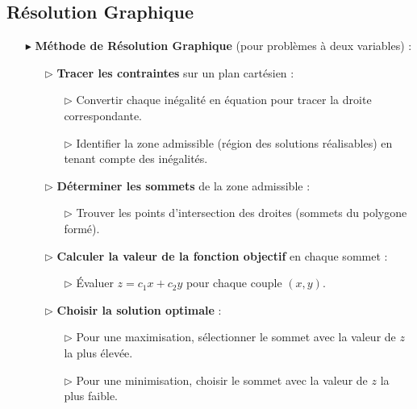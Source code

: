 \documentclass{report}
\begin{document}
\begin{multicols*}{2}
\section{Résolution Graphique}

\begin{itemize}
    \item[$\blacktriangleright$] \textbf{Méthode de Résolution Graphique} (pour problèmes à deux variables) :
    \begin{enumerate}
        \item[$\rhd$] \textbf{Tracer les contraintes} sur un plan cartésien :
        \begin{itemize}
            \item[$\rhd$] Convertir chaque inégalité en équation pour tracer la droite correspondante.
            \item[$\rhd$] Identifier la zone admissible (région des solutions réalisables) en tenant compte des inégalités.
        \end{itemize}
        \item[$\rhd$] \textbf{Déterminer les sommets} de la zone admissible :
        \begin{itemize}
            \item[$\rhd$] Trouver les points d'intersection des droites (sommets du polygone formé).
        \end{itemize}
        \item[$\rhd$] \textbf{Calculer la valeur de la fonction objectif} en chaque sommet :
        \begin{itemize}
            \item[$\rhd$] Évaluer $z = c_1x + c_2y$ pour chaque couple $(x, y)$.
        \end{itemize}
        \item[$\rhd$] \textbf{Choisir la solution optimale} :
        \begin{itemize}
            \item[$\rhd$] Pour une maximisation, sélectionner le sommet avec la valeur de $z$ la plus élevée.
            \item[$\rhd$] Pour une minimisation, choisir le sommet avec la valeur de $z$ la plus faible.
        \end{itemize}
    \end{enumerate}
\end{itemize}

\begin{center}
\end{center}
\end{multicols*}
\end{document}
